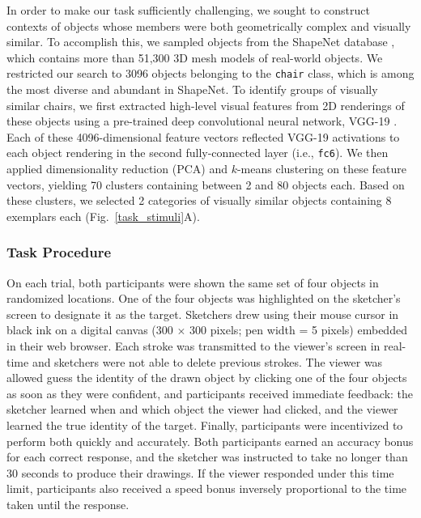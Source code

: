 \documentclass[10pt,letterpaper]{article}
\begin{document}
In order to make our task sufficiently challenging, we sought to construct contexts of objects whose members were both geometrically complex and visually similar. 
To accomplish this, we sampled objects from the ShapeNet database \cite{chang2015shapenet}, which contains more than 51,300 3D mesh models of real-world objects. %
We restricted our search to 3096 objects belonging to the \texttt{chair} class, which is among the most diverse and abundant in ShapeNet. 
To identify groups of visually similar chairs, we first extracted high-level visual features from 2D renderings of these objects using a pre-trained deep convolutional neural network, VGG-19 \cite{simonyan2014very}.
Each of these 4096-dimensional feature vectors reflected VGG-19 activations to each object rendering in the second fully-connected layer (i.e., \texttt{fc6}).
We then applied dimensionality reduction (PCA) and $k$-means clustering on these feature vectors, yielding 70 clusters containing between 2 and 80 objects each.
Based on these clusters, we selected 2 categories of visually similar objects containing 8 exemplars each (Fig.~\ref{task_stimuli}A). 

\subsubsection{Task Procedure} 

On each trial, both participants were shown the same set of four objects in randomized locations.
One of the four objects was highlighted on the sketcher's screen to designate it as the target.
Sketchers drew using their mouse cursor in black ink on a digital canvas (300 $\times$ 300 pixels; pen width = 5 pixels) embedded in their web browser. 
Each stroke was transmitted to the viewer's screen in real-time and sketchers were not able to delete previous strokes.
The viewer was allowed guess the identity of the drawn object by clicking one of the four objects as soon as they were confident, and participants received immediate feedback: the sketcher learned when and which object the viewer had clicked, and the viewer learned the true identity of the target. 
Finally, participants were incentivized to perform both quickly and accurately. 
Both participants earned an accuracy bonus for each correct response, and the sketcher was instructed to take no longer than 30 seconds to produce their drawings.
If the viewer responded under this time limit, participants also received a speed bonus inversely proportional to the time taken until the response.
\end{document}
